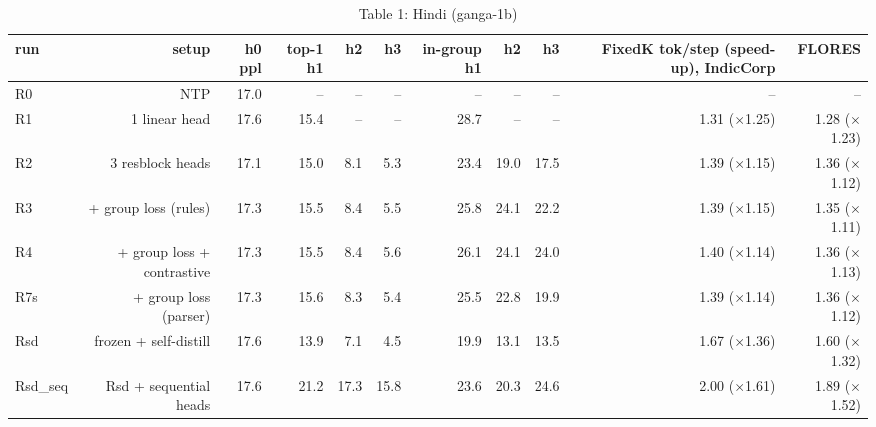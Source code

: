 \begin{table}[t]
\centering
\small
\caption{Table 1: Hindi (ganga-1b)}
\label{tab:table1_main_hi}
\begin{tabular}{lrrrrrrrrrr}
\toprule
run & setup & h0 ppl & top-1 h1 & h2 & h3 & in-group h1 & h2 & h3 & FixedK tok/step (speed-up), IndicCorp & FLORES \\
\midrule
R0 & NTP & 17.0 & -- & -- & -- & -- & -- & -- & -- & -- \\
R1 & 1 linear head & 17.6 & 15.4 & -- & -- & 28.7 & -- & -- & 1.31 ($\times$1.25) & 1.28 ($\times$1.23) \\
R2 & 3 resblock heads & 17.1 & 15.0 & 8.1 & 5.3 & 23.4 & 19.0 & 17.5 & 1.39 ($\times$1.15) & 1.36 ($\times$1.12) \\
R3 & + group loss (rules) & 17.3 & 15.5 & 8.4 & 5.5 & 25.8 & 24.1 & 22.2 & 1.39 ($\times$1.15) & 1.35 ($\times$1.11) \\
R4 & + group loss + contrastive & 17.3 & 15.5 & 8.4 & 5.6 & 26.1 & 24.1 & 24.0 & 1.40 ($\times$1.14) & 1.36 ($\times$1.13) \\
R7s & + group loss (parser) & 17.3 & 15.6 & 8.3 & 5.4 & 25.5 & 22.8 & 19.9 & 1.39 ($\times$1.14) & 1.36 ($\times$1.12) \\
Rsd & frozen + self-distill & 17.6 & 13.9 & 7.1 & 4.5 & 19.9 & 13.1 & 13.5 & 1.67 ($\times$1.36) & 1.60 ($\times$1.32) \\
Rsd\_seq & Rsd + sequential heads & 17.6 & 21.2 & 17.3 & 15.8 & 23.6 & 20.3 & 24.6 & 2.00 ($\times$1.61) & 1.89 ($\times$1.52) \\
\bottomrule
\end{tabular}
\end{table}
